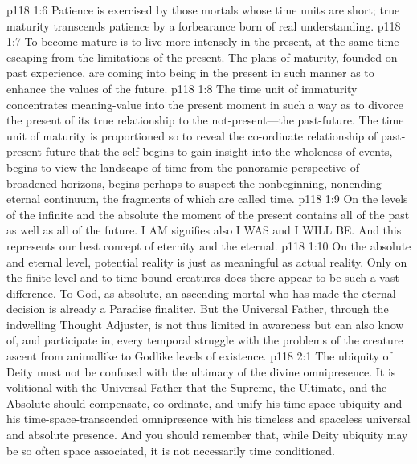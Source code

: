 \pc \vs p118 1:6 Patience is exercised by those mortals whose time units are short; true maturity transcends patience by a forbearance born of real understanding.
\pc \vs p118 1:7 To become mature is to live more intensely in the present, at the same time escaping from the limitations of the present. The plans of maturity, founded on past experience, are coming into being in the present in such manner as to enhance the values of the future.
\vs p118 1:8 The time unit of immaturity concentrates meaning\hyp{}value into the present moment in such a way as to divorce the present of its true relationship to the not\hyp{}present---the past\hyp{}future. The time unit of maturity is proportioned so to reveal the co\hyp{}ordinate relationship of past\hyp{}present\hyp{}future that the self begins to gain insight into the wholeness of events, begins to view the landscape of time from the panoramic perspective of broadened horizons, begins perhaps to suspect the nonbeginning, nonending eternal continuum, the fragments of which are called time.
\vs p118 1:9 On the levels of the infinite and the absolute the moment of the present contains all of the past as well as all of the future. I AM signifies also I WAS and I WILL BE. And this represents our best concept of eternity and the eternal.
\vs p118 1:10 On the absolute and eternal level, potential reality is just as meaningful as actual reality. Only on the finite level and to time\hyp{}bound creatures does there appear to be such a vast difference. To God, as absolute, an ascending mortal who has made the eternal decision is already a Paradise finaliter. But the Universal Father, through the indwelling Thought Adjuster, is not thus limited in awareness but can also know of, and participate in, every temporal struggle with the problems of the creature ascent from animallike to Godlike levels of existence.
\vs p118 2:1 The ubiquity of Deity must not be confused with the ultimacy of the divine omnipresence. It is volitional with the Universal Father that the Supreme, the Ultimate, and the Absolute should compensate, co\hyp{}ordinate, and unify his time\hyp{}space ubiquity and his time\hyp{}space\hyp{}transcended omnipresence with his timeless and spaceless universal and absolute presence. And you should remember that, while Deity ubiquity may be so often space associated, it is not necessarily time conditioned.

